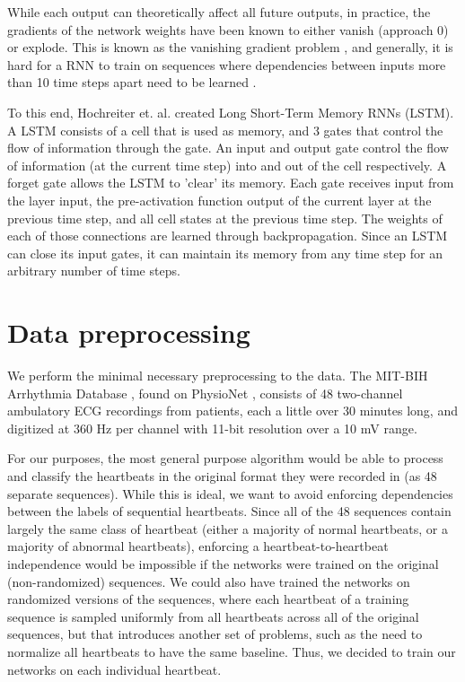 \documentclass{article} %
\begin{document}
While each output can theoretically affect all future outputs, in practice, the gradients of the network weights have been known to either vanish (approach 0) or explode. This is known as the vanishing gradient problem \cite{Hochreiter}, and generally, it is hard for a RNN to train on sequences where dependencies between inputs more than 10 time steps apart need to be learned \cite{Graves}. 

To this end, Hochreiter et. al. created Long Short-Term Memory RNNs \cite{LSTM}(LSTM). A LSTM consists of a cell that is used as memory, and 3 gates that control the flow of information through the gate. An input and output gate control the flow of information (at the current time step) into and out of the cell respectively. A forget gate allows the LSTM to 'clear' its memory. Each gate receives input from the layer input, the pre-activation function output of the current layer at the previous time step, and all cell states at the previous time step. The weights of each of those connections are learned through backpropagation. Since an LSTM can close its input gates, it can maintain its memory from any time step for an arbitrary number of time steps. 

\section{Data preprocessing}
We perform the minimal necessary preprocessing to the data. The MIT-BIH Arrhythmia Database \cite{Moody}, found on PhysioNet \cite{physionet}, consists of 48 two-channel ambulatory ECG recordings from patients, each a little over 30 minutes long, and digitized at 360 Hz per channel with 11-bit resolution over a 10 mV range.

For our purposes, the most general purpose algorithm would be able to process and classify the heartbeats in the original format they were recorded in (as 48 separate sequences). While this is ideal, we want to avoid enforcing dependencies between the labels of sequential heartbeats. Since all of the 48 sequences contain largely the same class of heartbeat (either a majority of normal heartbeats, or a majority of abnormal heartbeats), enforcing a heartbeat-to-heartbeat independence would be impossible if the networks were trained on the original (non-randomized) sequences. We could also have trained the networks on randomized versions of the sequences, where each heartbeat of a training sequence is sampled uniformly from all heartbeats across all of the original sequences, but that introduces another set of problems, such as the need to normalize all heartbeats to have the same baseline. Thus, we decided to train our networks on each individual heartbeat.
\end{document}
